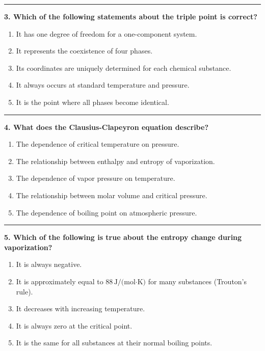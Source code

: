 \documentclass[
  9pt,
]{extbook}
\providecommand{\tightlist}{%
  \setlength{\itemsep}{0pt}\setlength{\parskip}{0pt}}
\theoremstyle{definition}
\theoremstyle{definition}
\theoremstyle{definition}
\theoremstyle{definition}
\theoremstyle{remark}
\begin{document}
\begin{center}\rule{0.5\linewidth}{0.5pt}\end{center}

\textbf{3. Which of the following statements about the triple point is correct?}

\begin{enumerate}
\def\labelenumi{\alph{enumi}.}
\tightlist
\item
  It has one degree of freedom for a one-component system.
\item
  It represents the coexistence of four phases.
\item
  Its coordinates are uniquely determined for each chemical substance.
\item
  It always occurs at standard temperature and pressure.
\item
  It is the point where all phases become identical.
\end{enumerate}

\begin{center}\rule{0.5\linewidth}{0.5pt}\end{center}

\textbf{4. What does the Clausius-Clapeyron equation describe?}

\begin{enumerate}
\def\labelenumi{\alph{enumi}.}
\tightlist
\item
  The dependence of critical temperature on pressure.
\item
  The relationship between enthalpy and entropy of vaporization.
\item
  The dependence of vapor pressure on temperature.
\item
  The relationship between molar volume and critical pressure.
\item
  The dependence of boiling point on atmospheric pressure.
\end{enumerate}

\begin{center}\rule{0.5\linewidth}{0.5pt}\end{center}

\textbf{5. Which of the following is true about the entropy change during vaporization?}

\begin{enumerate}
\def\labelenumi{\alph{enumi}.}
\tightlist
\item
  It is always negative.
\item
  It is approximately equal to \(88\,\text{J/(mol·K)}\) for many substances (Trouton's rule).
\item
  It decreases with increasing temperature.
\item
  It is always zero at the critical point.
\item
  It is the same for all substances at their normal boiling points.
\end{enumerate}
\end{document}
